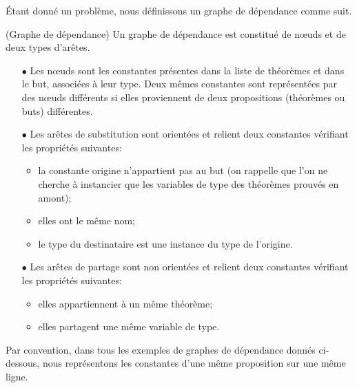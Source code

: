 Étant donné un problème, nous définissons un graphe de dépendance comme suit.
\begin{mydef} (Graphe de dépendance)
Un graphe de dépendance est constitué de nœuds et de deux types
d'arêtes.
\begin{enumerate}
\item[$\bullet$] Les nœuds sont les constantes présentes dans la liste
  de théorèmes et dans le but, associées à leur type. Deux mêmes
  constantes sont représentées par des nœuds différents si elles
  proviennent de deux propositions (théorèmes ou buts) différentes.
\item[$\bullet$] Les arêtes de {\color{blue}substitution} sont orientées
  et relient deux
  constantes vérifiant les propriétés suivantes:
  \begin{itemize}
  \item la constante origine n'appartient pas au but (on rappelle que
    l'on ne cherche à instancier que les variables de type des théorèmes
    prouvés en amont);
  \item elles ont le même nom;
  \item le type du destinataire est une instance du type de l'origine.
  \end{itemize}
\item[$\bullet$] Les arêtes de {\color{green}partage} sont non
  orientées et relient deux constantes
  vérifiant les propriétés suivantes:
  \begin{itemize}
  \item elles appartiennent à un même théorème;
  \item elles partagent une même variable de type.
  \end{itemize}
\end{enumerate}
\end{mydef}

Par convention, dans tous les exemples de graphes de dépendance donnés
ci-dessous, nous représentons les constantes d'une même proposition sur
une même ligne.

